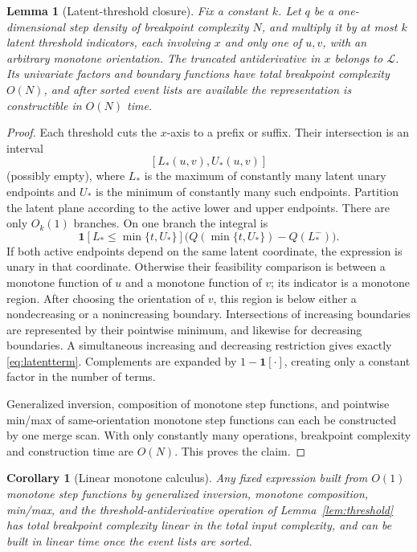 \documentclass[12pt,a4paper]{article}
\newtheorem{lemma}[theorem]{Lemma}
\newtheorem{corollary}[theorem]{Corollary}
\theoremstyle{definition}
\newcommand{\1}{\mathbf 1}
\begin{document}
\begin{lemma}[Latent-threshold closure]                          \label{lem:latentclosure}
Fix a constant $k$. Let $q$ be a one-dimensional step density of breakpoint complexity $N$, and multiply it by at most $k$ latent threshold indicators, each involving $x$ and only one of $u,v$, with an arbitrary monotone orientation. The truncated antiderivative in $x$ belongs to $\mathcal L$. Its univariate factors and boundary functions have total breakpoint complexity $O(N)$, and after sorted event lists are available the representation is constructible in $O(N)$ time.
\end{lemma}

\begin{proof}
Each threshold cuts the $x$-axis to a prefix or suffix. Their intersection is an interval
\[
[L_*(u,v),U_*(u,v)]
\]
(possibly empty), where $L_*$ is the maximum of constantly many latent unary endpoints and $U_*$ is the minimum of constantly many such endpoints. Partition the latent plane according to the active lower and upper endpoints. There are only $O_k(1)$ branches. On one branch the integral is
\[
\1[L_*\le \min\{t,U_*\}]\bigl(Q(\min\{t,U_*\})-Q(L_*^-)\bigr).
\]
If both active endpoints depend on the same latent coordinate, the expression is unary in that coordinate. Otherwise their feasibility comparison is between a monotone function of $u$ and a monotone function of $v$; its indicator is a monotone region. After choosing the orientation of $v$, this region is below either a nondecreasing or a nonincreasing boundary. Intersections of increasing boundaries are represented by their pointwise minimum, and likewise for decreasing boundaries. A simultaneous increasing and decreasing restriction gives exactly \eqref{eq:latentterm}. Complements are expanded by $1-\1[\cdot]$, creating only a constant factor in the number of terms.

Generalized inversion, composition of monotone step functions, and pointwise min/max of same-orientation monotone step functions can each be constructed by one merge scan. With only constantly many operations, breakpoint complexity and construction time are $O(N)$. This proves the claim.
\end{proof}

\begin{corollary}[Linear monotone calculus]                      \label{cor:linearcalc}
Any fixed expression built from $O(1)$ monotone step functions by generalized inversion, monotone composition, min/max, and the threshold-antiderivative operation of Lemma~\ref{lem:threshold} has total breakpoint complexity linear in the total input complexity, and can be built in linear time once the event lists are sorted.
\end{corollary}
\end{document}
